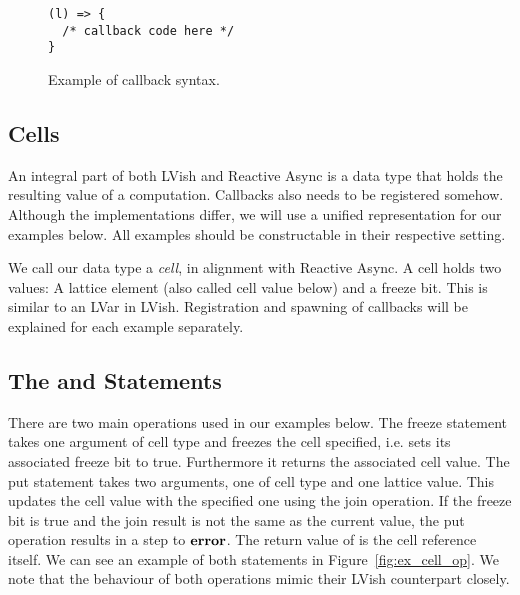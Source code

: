 \begin{figure}
  \centering
  \begin{minipage}{0.763\textwidth}
    \begin{lstlisting}[]
(l) => {
  /* callback code here */
}
    \end{lstlisting}
  \end{minipage}
  \caption{Example of callback syntax.}
  \label{fig:callback_syntax}
\end{figure}

\subsection{Cells}%
\label{sub:cells}

An integral part of both LVish and Reactive Async is a data type that holds 
the resulting value of a computation. Callbacks also needs to be
registered somehow. Although the implementations differ, we will
use a unified representation for our examples below. All examples should be
constructable in their respective setting.

We call our data type a \emph{cell}, in alignment with Reactive Async. A cell
holds two values: A lattice element (also called cell value below) and a freeze bit.
This is similar to an LVar in LVish. Registration and spawning of callbacks will
be explained for each example separately.

\subsection{The  and  Statements}%
\label{sub:the_put_statement}

There are two main operations used in our examples below. The freeze
statement  takes one argument of cell type and freezes the cell
specified, i.e. sets its associated freeze bit to true. Furthermore it returns
the associated cell value. The put statement  takes two arguments,
one of cell type and one lattice value. This updates the cell value with the
specified one using the join operation. If the freeze bit is true and the join
result is not the same as the current value, the put operation results in a step
to $\mbox{{\bf error}}$. The return value of  is the cell reference itself. We can
see an example of both statements in Figure~\ref{fig:ex_cell_op}. We note that
the behaviour of both operations mimic their LVish counterpart closely.



